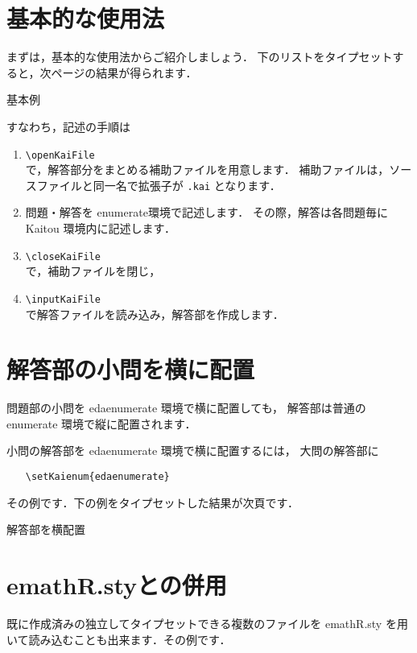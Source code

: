 \documentclass{jarticle}
\def\showExP#1#2{%
    \begin{itembox}{#1}
    
    \end{itembox}

\clearpage

    \begin{shadebox}
    \begin{minipage}[t][.98\textheight]{.98\linewidth}
    
    \end{minipage}
    \end{shadebox}
}%
\begin{document}
\clearpage

\section{基本的な使用法}
まずは，基本的な使用法からご紹介しましょう．
下のリストをタイプセットすると，次ページの結果が得られます．

\showExP{基本例}{example/ex01}

\clearpage

すなわち，記述の手順は
\begin{enumerate}[1.\ ]
    \item \verb/\openKaiFile/\\
        で，解答部分をまとめる補助ファイルを用意します．
        補助ファイルは，ソースファイルと同一名で拡張子が \texttt{.kai}
        となります．
    \item 問題・解答を \textsf{enumerate}環境で記述します．
        その際，解答は各問題毎に \textsf{Kaitou} 環境内に記述します．
    \item \verb/\closeKaiFile/\\
        で，補助ファイルを閉じ，
    \item \verb/\inputKaiFile/\\
        で解答ファイルを読み込み，解答部を作成します．
\end{enumerate}
\clearpage

\section{解答部の小問を横に配置}
問題部の小問を \textsf{edaenumerate} 環境で横に配置しても，
解答部は普通の\\
\textsf{enumerate} 環境で縦に配置されます．

小問の解答部を \textsf{edaenumerate} 環境で横に配置するには，
大問の解答部に 

\begin{screen}
\begin{verbatim}
　　\setKaienum{edaenumerate}
\end{verbatim}
\end{screen}
その例です．下の例をタイプセットした結果が次頁です．

\showExP{解答部を横配置}{example/ex02}

\section{\textsf{emathR.sty}との併用}
既に作成済みの独立してタイプセットできる複数のファイルを \textsf{emathR.sty}
を用いて読み込むことも出来ます．その例です．
\end{document}
